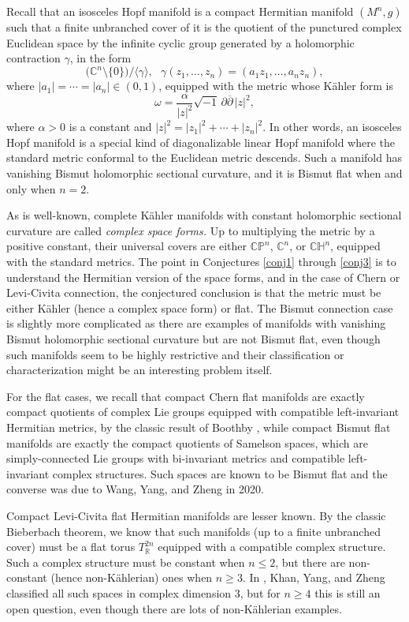 \documentclass{amsart}
\numberwithin{equation}{section}
\begin{document}
Recall that an isosceles Hopf manifold is a compact Hermitian manifold $(M^n,g)$ such that a finite unbranched cover of it is the quotient of the punctured complex Euclidean space by the infinite cyclic group generated by a holomorphic contraction $\gamma$, in the form
$$ \big({\mathbb C}^n\setminus \{0\}\big)/ \langle \gamma \rangle , \ \ \ \gamma(z_1,  \ldots , z_n) = (a_1z_1,  \ldots , a_nz_n), $$
where $|a_1|= \cdots = |a_n| \in (0,1)$, equipped with the metric whose K\"ahler form is
$$\omega = \frac{\alpha }{|z|^2} \sqrt{-1} \,\partial \overline{\partial} \,|z|^2, $$
where $\alpha >0$ is a constant and $|z|^2 = |z_1|^2 + \cdots + |z_n|^2$. In other words, an isosceles Hopf manifold is a special kind of diagonalizable linear Hopf manifold where the standard metric conformal to the Euclidean metric descends. Such a manifold has vanishing Bismut holomorphic sectional curvature, and it is Bismut flat when and only when $n=2$.

As is well-known, complete K\"ahler manifolds with constant holomorphic sectional curvature are called {\em complex space forms.} Up to multiplying the metric by a positive constant, their universal covers are either ${\mathbb C}{\mathbb P}^n$, ${\mathbb C}^n$, or ${\mathbb C}{\mathbb H}^n$, equipped with the standard metrics. The point in Conjectures \ref{conj1} through \ref{conj3} is to understand the Hermitian version of the space forms, and in the case of Chern or Levi-Civita connection, the conjectured conclusion is that the metric must be either K\"ahler (hence a complex space form) or flat. The Bismut connection case is slightly more complicated as there are examples of manifolds with vanishing Bismut holomorphic sectional curvature but are not Bismut flat, even though such manifolds seem to be highly restrictive and their classification or characterization might be an interesting problem itself.

For the flat cases, we recall that compact Chern flat manifolds are exactly compact quotients of complex Lie groups equipped with compatible left-invariant Hermitian metrics, by the classic result of Boothby \cite{Boothby}, while compact Bismut flat manifolds are exactly the compact quotients of Samelson spaces, which are simply-connected Lie groups with bi-invariant metrics and compatible left-invariant complex structures. Such spaces are known to be Bismut flat \cite{Pittie} and the converse was due to Wang, Yang, and Zheng \cite{WYZ} in 2020.

Compact Levi-Civita flat Hermitian manifolds are lesser known. By the classic Bieberbach theorem, we know that such manifolds (up to a finite unbranched cover) must be a flat torus $T^{2n}_{\mathbb R}$ equipped with a compatible complex structure. Such a complex structure must be constant when $n\leq 2$, but there are non-constant (hence non-K\"ahlerian) ones when $n\geq 3$. In \cite{KYZ}, Khan, Yang, and Zheng classified all such spaces in complex dimension $3$, but for $n\geq 4$ this is still an open question, even though there are lots of non-K\"ahlerian examples.
\end{document}
